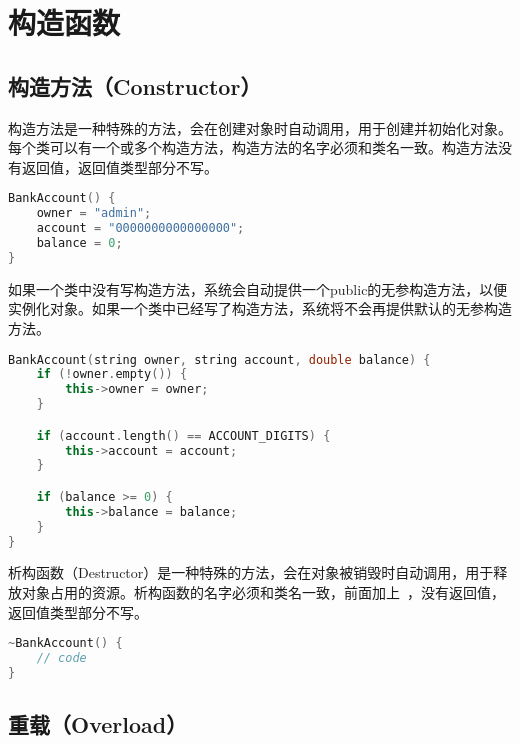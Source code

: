 \newpage

\section{构造函数}

\subsection{构造方法（Constructor）}

构造方法是一种特殊的方法，会在创建对象时自动调用，用于创建并初始化对象。每个类可以有一个或多个构造方法，构造方法的名字必须和类名一致。构造方法没有返回值，返回值类型部分不写。

\vspace{-0.5cm}

\begin{lstlisting}[language=C++]
BankAccount() {
    owner = "admin";
    account = "0000000000000000";
    balance = 0;
}
\end{lstlisting}

如果一个类中没有写构造方法，系统会自动提供一个public的无参构造方法，以便实例化对象。如果一个类中已经写了构造方法，系统将不会再提供默认的无参构造方法。

\vspace{-0.5cm}

\begin{lstlisting}[language=C++]
BankAccount(string owner, string account, double balance) {
    if (!owner.empty()) {
        this->owner = owner;
    }

    if (account.length() == ACCOUNT_DIGITS) {
        this->account = account;
    }

    if (balance >= 0) {
        this->balance = balance;
    }
}
\end{lstlisting}

析构函数（Destructor）是一种特殊的方法，会在对象被销毁时自动调用，用于释放对象占用的资源。析构函数的名字必须和类名一致，前面加上~，没有返回值，返回值类型部分不写。

\vspace{-0.5cm}

\begin{lstlisting}[language=C++]
~BankAccount() {
    // code
}
\end{lstlisting}

\vspace{0.5cm}

\subsection{重载（Overload）}

